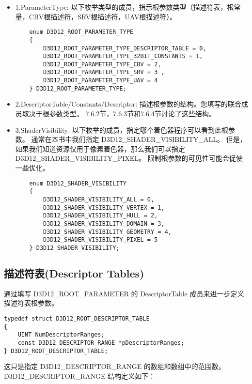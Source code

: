 \begin{itemize}
  \item 1.ParameterType: 以下枚举类型的成员，指示根参数类型（描述符表，根常量，CBV根描述符，SRV根描述符，UAV根描述符）。
  \begin{lstlisting}
    enum D3D12_ROOT_PARAMETER_TYPE
    {
        D3D12_ROOT_PARAMETER_TYPE_DESCRIPTOR_TABLE = 0,
        D3D12_ROOT_PARAMETER_TYPE_32BIT_CONSTANTS = 1,
        D3D12_ROOT_PARAMETER_TYPE_CBV = 2,
        D3D12_ROOT_PARAMETER_TYPE_SRV = 3 ,
        D3D12_ROOT_PARAMETER_TYPE_UAV = 4
    } D3D12_ROOT_PARAMETER_TYPE;
  \end{lstlisting}
  \item 2.DescriptorTable/Constants/Descriptor: 描述根参数的结构。您填写的联合成员取决于根参数类型。 7.6.2节，7.6.3节和7.6.4节讨论了这些结构。
  \item 3.ShaderVisibility: 以下枚举的成员，指定哪个着色器程序可以看到此根参数。 通常在本书中我们指定 D3D12\_SHADER\_VISIBILITY\_ALL。 但是，如果我们知道资源仅用于像素着色器，那么我们可以指定 D3D12\_SHADER\_VISIBILITY\_PIXEL。 限制根参数的可见性可能会促使一些优化。\\
  \begin{lstlisting}
    enum D3D12_SHADER_VISIBILITY
    {
        D3D12_SHADER_VISIBILITY_ALL = 0,
        D3D12_SHADER_VISIBILITY_VERTEX = 1,
        D3D12_SHADER_VISIBILITY_HULL = 2,
        D3D12_SHADER_VISIBILITY_DOMAIN = 3,
        D3D12_SHADER_VISIBILITY_GEOMETRY = 4,
        D3D12_SHADER_VISIBILITY_PIXEL = 5
    } D3D12_SHADER_VISIBILITY;
  \end{lstlisting}
\end{itemize}

\subsection{描述符表(Descriptor Tables)}
\begin{flushleft}
通过填写 D3D12\_ROOT\_PARAMETER 的 DescriptorTable 成员来进一步定义描述符表根参数。\\
\end{flushleft}

\begin{lstlisting}
typedef struct D3D12_ROOT_DESCRIPTOR_TABLE
{
    UINT NumDescriptorRanges;
    const D3D12_DESCRIPTOR_RANGE *pDescriptorRanges;
} D3D12_ROOT_DESCRIPTOR_TABLE;
\end{lstlisting}

\begin{flushleft}
这只是指定 D3D12\_DESCRIPTOR\_RANGE 的数组和数组中的范围数。\\
D3D12\_DESCRIPTOR\_RANGE 结构定义如下：\\
\end{flushleft}

